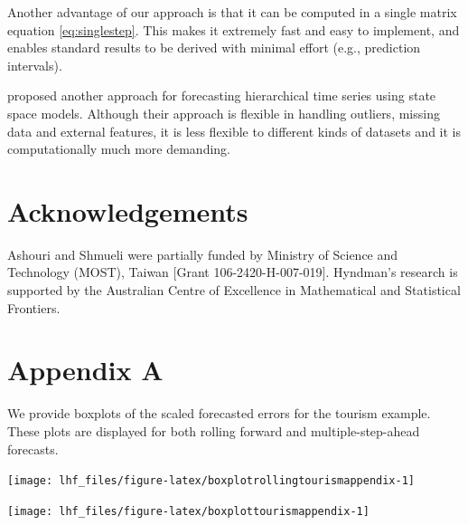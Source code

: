 \documentclass[11pt,a4paper,]{article}
\let\origfigure\figure
\let\endorigfigure\endfigure
\renewenvironment{figure}[1][2] {
    \expandafter\origfigure\expandafter[!htbp]
} {
    \endorigfigure
}
\begin{document}
Another advantage of our approach is that it can be computed in a single matrix equation \eqref{eq:singlestep}. This makes it extremely fast and easy to implement, and enables standard results to be derived with minimal effort (e.g., prediction intervals).

\textcite{pennings2017} proposed another approach for forecasting hierarchical time series using state space models. Although their approach is flexible in handling outliers, missing data and external features, it is less flexible to different kinds of datasets and it is computationally much more demanding.

\hypertarget{acknowledgements}{%
\section*{Acknowledgements}\label{acknowledgements}}

Ashouri and Shmueli were partially funded by Ministry of Science and Technology (MOST), Taiwan {[}Grant 106-2420-H-007-019{]}. Hyndman's research is supported by the Australian Centre of Excellence in Mathematical and Statistical Frontiers.

\clearpage

\hypertarget{appendixA}{%
\section*{Appendix A}\label{appendixA}}

We provide boxplots of the scaled forecasted errors for the tourism example. These plots are displayed for both rolling forward and multiple-step-ahead forecasts.

\begin{figure}

{\centering \texttt{[image: lhf\_files/figure-latex/boxplotrollingtourismappendix-1]} 

}

\caption{Box plots of scaled forecast errors from reconciled and unreconciled ETS, ARIMA and OLS methods at each hierarchical level for rolling origin 1-step-ahead tourism demand.}\label{fig:boxplotrollingtourismappendix}
\end{figure}

\begin{figure}

{\centering \texttt{[image: lhf\_files/figure-latex/boxplottourismappendix-1]} 

}

\caption{Box plots of scaled forecast errors from reconciled and unreconciled ETS, ARIMA and OLS methods at each hierarchical level for fixed origin multi-step-ahead tourism demand.}\label{fig:boxplottourismappendix}
\end{figure}
\end{document}
